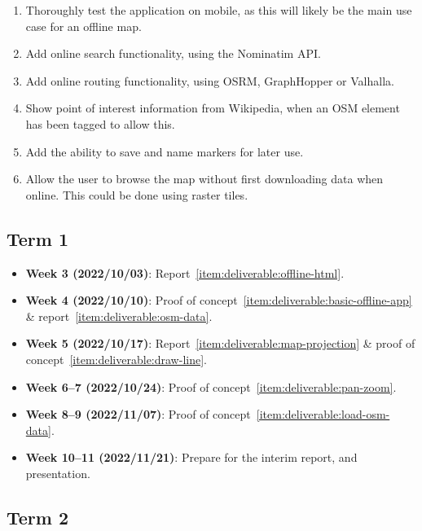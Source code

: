 \documentclass[]{final_report}
\begin{document}
\begin{enumerate}
    \item Thoroughly test the application on mobile, as this will likely be the main use case for an offline map.\label{item:deliverable:mobile-testing}
    \item Add online search functionality, using the Nominatim API.\label{item:deliverable:search}
    \item Add online routing functionality, using OSRM, GraphHopper or Valhalla.\label{item:deliverable:routing}
    \item Show point of interest information from Wikipedia, when an OSM element has been tagged to allow this.\label{item:deliverable:wikipedia}
    \item Add the ability to save and name markers for later use.\label{item:deliverable:markers}
    \item Allow the user to browse the map without first downloading data when online. This could be done using raster tiles.\label{item:deliverable:online}
\end{enumerate}

\subsection{Term 1}

\begin{itemize}
    \item \textbf{Week 3 (2022/10/03)}: Report~\ref{item:deliverable:offline-html}.
    \item \textbf{Week 4 (2022/10/10)}: Proof of concept~\ref{item:deliverable:basic-offline-app} \& report~\ref{item:deliverable:osm-data}.
    \item \textbf{Week 5 (2022/10/17)}: Report~\ref{item:deliverable:map-projection} \& proof of concept~\ref{item:deliverable:draw-line}.
    \item \textbf{Week 6--7 (2022/10/24)}: Proof of concept~\ref{item:deliverable:pan-zoom}.
    \item \textbf{Week 8--9 (2022/11/07)}: Proof of concept~\ref{item:deliverable:load-osm-data}.
    \item \textbf{Week 10--11 (2022/11/21)}: Prepare for the interim report, and presentation.
\end{itemize}

\subsection{Term 2}
\end{document}
